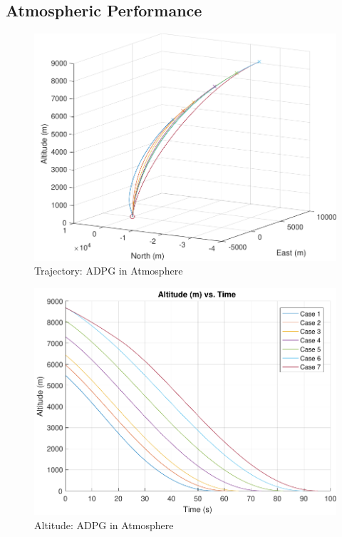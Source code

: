\subsection{Atmospheric Performance} \label{sec:atmoperf}

\begin{figure}[H]
	\centering
	\begin{minipage}{4.5 in}
		\includegraphics[width=\linewidth]{Figures/trajpowatmo.pdf}
		\caption{Trajectory: ADPG in Atmosphere \label{fig:trajpowatmo} }
	\end{minipage}
\end{figure}

\begin{figure}[H]
	\centering
	\begin{minipage}{4.5 in}
		\includegraphics[width=\linewidth]{Figures/altpowatmo.pdf}
		\caption{Altitude: ADPG in Atmosphere \label{fig:altpowatmo} }
	\end{minipage}
\end{figure}

